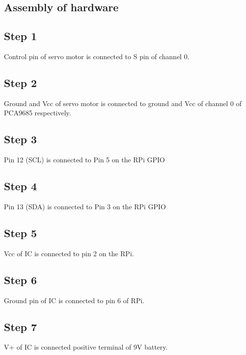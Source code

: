 \documentclass[a4paper,12pt,oneside]{book}
\begin{document}
\subsection*{Assembly of hardware}
\subsection*{Step 1}
Control pin of servo motor is connected to S pin of channel 0.
\subsection*{Step 2}
Ground and Vcc of servo motor is connected to ground and Vcc of channel 0 of PCA9685 respectively. 
\subsection*{Step 3}
Pin 12 (SCL) is connected to Pin 5 on the RPi GPIO
\subsection*{Step 4}
Pin 13 (SDA) is connected to Pin 3 on the RPi GPIO
\subsection*{Step 5}
Vcc of IC is connected to pin 2 on the RPi.
\subsection*{Step 6}
Ground pin of IC is connected to pin 6 of RPi.
\subsection*{Step 7}
V+ of IC is connected positive terminal of 9V battery.
\end{document}
